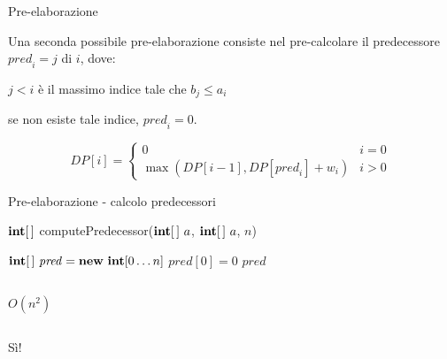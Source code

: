 \begin{frame}{Pre-elaborazione}

\vspace{-9pt}
Una seconda possibile pre-elaborazione consiste nel pre-calcolare il \alert{predecessore} \alert{$\mathit{pred}_i = j$} di $i$, dove:
\BIL
\item $j<i$ è il massimo indice tale che $b_j \leq a_i$
\item se non esiste tale indice, $\mathit{pred}_i=0$.
\EIL

\begin{center}
\end{center}


\[
  DP[i] = \begin{cases}
    0 & i = 0 \\
    \max (DP[i-1], DP[\mathit{pred}_i] + w_i) & i > 0
  \end{cases}
\]

\end{frame}

\begin{frame}{Pre-elaborazione - calcolo predecessori}

\vspace{-9pt}
\begin{Procedure}
\caption[A]{$\INTEGER[\,]$ \textsf{computePredecessor($\INTEGER[\,]\ a$, $\INTEGER[\,]\ a$, \INTEGER $n$)}}    
$\INTARRAY\ \mathit{pred} = \NEW\ \INTEGER[0 \ldots n]$\;
$\mathit{pred}[0] = 0$\;
\Return $\mathit{pred}$\;
\end{Procedure}

\vspace{-9pt}
\begin{columns}[T]
\pause
{}
\bigskip\smallskip
$O(n^2)$
\end{columns}

\begin{columns}[T]
\pause
{}
\bigskip\smallskip
Sì!
\end{columns}

\end{frame}

